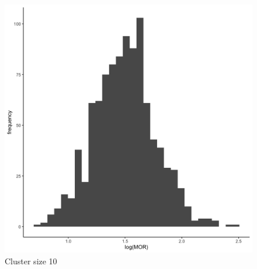 \documentclass[
  letterpaper,
  DIV=11,
  numbers=noendperiod,
  titlepage]{scrartcl}
\begin{document}
\begin{figure}
\begin{minipage}[t]{0.24\linewidth}
{{\includegraphics{../../plots/two-lvl-ran-int/low-prev/hist_100_10_two_lvl_low_prev.png}

}

\caption{Cluster size 10}

}

\end{minipage}%
%
\begin{minipage}[t]{0.24\linewidth}

{\centering 

}
\end{minipage}
\end{figure}
\end{document}
